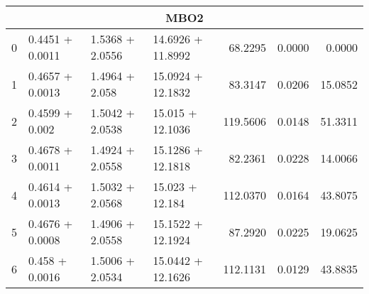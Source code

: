 \begin{tabular}{llllrrr}
  \midrule
  \multicolumn{7}{c}{MBO2} \\
  \midrule
  0 &  0.4451 + 0.0011 &  1.5368 + 2.0556 &  14.6926 + 11.8992 &             68.2295 &                 0.0000 &         0.0000 \\
  1 &  0.4657 + 0.0013 &   1.4964 + 2.058 &  15.0924 + 12.1832 &             83.3147 &                 0.0206 &        15.0852 \\
  2 &   0.4599 + 0.002 &  1.5042 + 2.0538 &   15.015 + 12.1036 &            119.5606 &                 0.0148 &        51.3311 \\
  3 &  0.4678 + 0.0011 &  1.4924 + 2.0558 &  15.1286 + 12.1818 &             82.2361 &                 0.0228 &        14.0066 \\
  4 &  0.4614 + 0.0013 &  1.5032 + 2.0568 &    15.023 + 12.184 &            112.0370 &                 0.0164 &        43.8075 \\
  5 &  0.4676 + 0.0008 &  1.4906 + 2.0558 &  15.1522 + 12.1924 &             87.2920 &                 0.0225 &        19.0625 \\
  6 &   0.458 + 0.0016 &  1.5006 + 2.0534 &  15.0442 + 12.1626 &            112.1131 &                 0.0129 &        43.8835 \\
  \bottomrule
  \end{tabular}
  